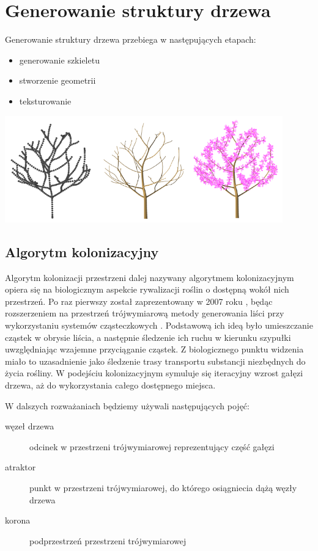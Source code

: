 \section{Generowanie struktury drzewa}
Generowanie struktury drzewa przebiega w następujących etapach:
\begin{itemize}
\item generowanie szkieletu
\item stworzenie geometrii
\item teksturowanie
\end{itemize}
\begin{center}
	\includegraphics[width=120mm]{images/colonization/generation.png}
	\label{colonization_generation}
\end{center}
\subsection{Algorytm kolonizacyjny}
Algorytm kolonizacji przestrzeni dalej nazywany algorytmem kolonizacyjnym opiera się na biologicznym aspekcie rywalizacji roślin o dostępną wokół nich przestrzeń. 
Po raz pierwszy został zaprezentowany w 2007 roku \cite{spaceColonization}, będąc rozszerzeniem na przestrzeń trójwymiarową metody generowania liści przy wykorzystaniu systemów cząsteczkowych \cite{particleMethod}. 
Podstawową ich ideą było umieszczanie cząstek w obrysie liścia, a następnie śledzenie ich ruchu w kierunku szypułki uwzględniając wzajemne przyciąganie cząstek. 
Z biologicznego punktu widzenia miało to uzasadnienie jako śledzenie trasy transportu substancji niezbędnych do życia rośliny. 
W podejściu kolonizacyjnym symuluje się iteracyjny wzrost gałęzi drzewa, aż do wykorzystania całego dostępnego miejsca.

\newpage
W dalszych rozważaniach będziemy używali następujących pojęć:\begin{description}
	\item[węzeł drzewa] odcinek w przestrzeni trójwymiarowej reprezentujący część gałęzi
	\item[atraktor] punkt w przestrzeni trójwymiarowej, do którego osiągniecia dążą węzły drzewa
	\item[korona] podprzestrzeń przestrzeni trójwymiarowej
\end{description}

